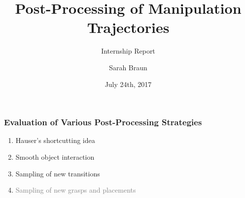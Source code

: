 \documentclass[12pt, %
			  t     %
]{beamer}%
\title{Post-Processing of Manipulation Trajectories}%
\subtitle{Internship Report}%
\author[Excellent]{Sarah Braun}%
\institute[TU München]{Technische Universität München}%
\date{July 24th, 2017}%
\begin{document}

\begin{frame}[plain]
  \titlepage
\end{frame}

\begin{frame}
  \frametitle{Evaluation of Various Post-Processing Strategies}
  \begin{enumerate}
  \item Hauser's shortcutting idea
  \item Smooth object interaction
  \item Sampling of new transitions
  \item \textcolor{gray}{Sampling of new grasps and placements}
  \end{enumerate}
\end{frame}
\end{document}
